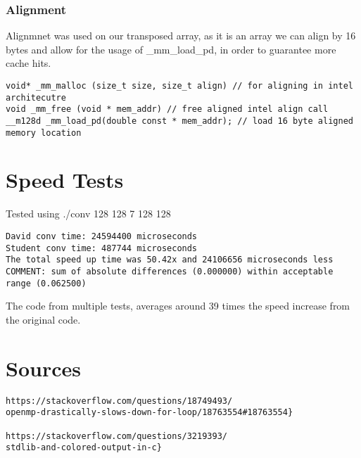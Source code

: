 \documentclass[12pt,fleqn,leqno,letterpaper]{article}
\begin{document}
\subsubsection{Alignment}
Alignmnet was used on our transposed array, as it is an array we can align by 16 bytes and allow
for the usage of \_mm\_load\_pd, in order to guarantee more cache hits.

\begin{verbatim}
void* _mm_malloc (size_t size, size_t align) // for aligning in intel architecutre
void _mm_free (void * mem_addr) // free aligned intel align call
__m128d _mm_load_pd(double const * mem_addr); // load 16 byte aligned memory location
\end{verbatim}

\section{Speed Tests}
Tested using ./conv 128 128 7 128 128 
\begin{verbatim}
David conv time: 24594400 microseconds
Student conv time: 487744 microseconds
The total speed up time was 50.42x and 24106656 microseconds less
COMMENT: sum of absolute differences (0.000000) within acceptable range (0.062500)
\end{verbatim}
The code from multiple tests, averages around 39 times the speed increase from the original
code.

\section{Sources}
\begin{verbatim}
https://stackoverflow.com/questions/18749493/
openmp-drastically-slows-down-for-loop/18763554#18763554}

https://stackoverflow.com/questions/3219393/
stdlib-and-colored-output-in-c}
\end{verbatim}
%
\end{document}
